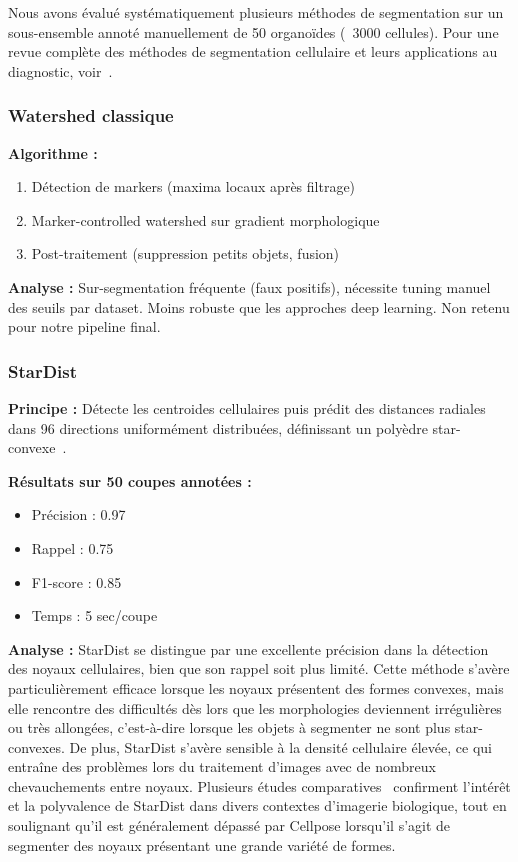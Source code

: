 Nous avons évalué systématiquement plusieurs méthodes de segmentation sur un sous-ensemble annoté manuellement de 50 organoïdes (~3000 cellules). Pour une revue complète des méthodes de segmentation cellulaire et leurs applications au diagnostic, voir~\cite{Nunes2024,Rayed2024,Wang2022Segmentation}.

\subsubsection{Watershed classique}

\textbf{Algorithme :}
\begin{enumerate}
    \item Détection de markers (maxima locaux après filtrage)
    \item Marker-controlled watershed sur gradient morphologique
    \item Post-traitement (suppression petits objets, fusion)
\end{enumerate}

\textbf{Analyse :}
Sur-segmentation fréquente (faux positifs), nécessite tuning manuel des seuils par dataset. Moins robuste que les approches deep learning. Non retenu pour notre pipeline final.

\subsubsection{StarDist}

\textbf{Principe :}
Détecte les centroides cellulaires puis prédit des distances radiales dans 96 directions uniformément distribuées, définissant un polyèdre star-convexe~\cite{Schmidt2018}.

\textbf{Résultats sur 50 coupes annotées :}
\begin{itemize}
    \item Précision : 0.97
    \item Rappel : 0.75
    \item F1-score : 0.85
    \item Temps : 5 sec/coupe
\end{itemize}

\textbf{Analyse :}
StarDist se distingue par une excellente précision dans la détection des noyaux cellulaires, bien que son rappel soit plus limité. Cette méthode s’avère particulièrement efficace lorsque les noyaux présentent des formes convexes, mais elle rencontre des difficultés dès lors que les morphologies deviennent irrégulières ou très allongées, c’est-à-dire lorsque les objets à segmenter ne sont plus star-convexes. De plus, StarDist s’avère sensible à la densité cellulaire élevée, ce qui entraîne des problèmes lors du traitement d’images avec de nombreux chevauchements entre noyaux. Plusieurs études comparatives~\cite{Weigert2022,Kleinberg2022} confirment l’intérêt et la polyvalence de StarDist dans divers contextes d’imagerie biologique, tout en soulignant qu’il est généralement dépassé par Cellpose lorsqu’il s’agit de segmenter des noyaux présentant une grande variété de formes.

